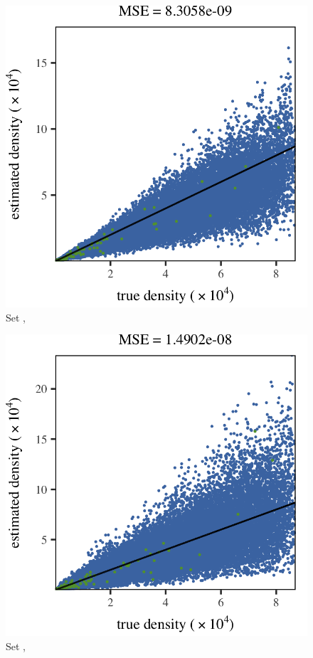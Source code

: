 
\begin{subfigure}{0.3\textwidth}
	\centering
	\includegraphics[keepaspectratio=true, width=\textwidth, height=0.23\textheight]{result/img/results_ferdosi_1_60000_mbe_silverman}
	\caption{Set \ferdosiOne, \mbe}
	\label{fig:results:singlesphere:mbe:ferdosi1}
\end{subfigure}
\begin{subfigure}{0.3\textwidth}
	\centering
	\includegraphics[keepaspectratio=true, width=\textwidth, height=0.23\textheight]{result/img/results_baakman_1_60000_mbe_silverman}
	\caption{Set \baakmanOne, \mbe}
	\label{fig:results:singlesphere:mbe:baakman1}
\end{subfigure}
